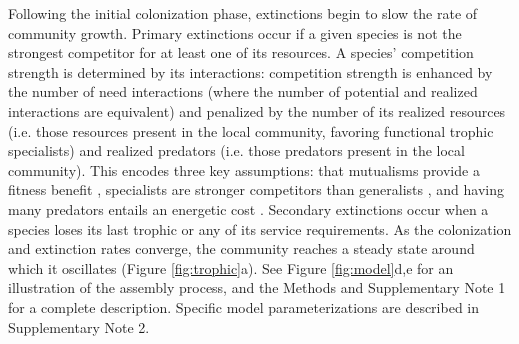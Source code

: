 \documentclass[twocolumn,preprintnumbers,amsmath,amssymb,superscriptaddress,linenumbers]{revtex4-1}
\begin{document}
Following the initial colonization phase, extinctions begin to slow the rate of community growth.
Primary extinctions occur if a given species is not the strongest competitor for at least one of its resources.
A species' competition strength is determined by its interactions: competition strength is enhanced by the number of need interactions (where the number of potential and realized interactions are equivalent) and penalized by the number of its realized resources (i.e. those resources present in the local community, favoring functional trophic specialists) and realized predators (i.e. those predators present in the local community).
This encodes three key assumptions: that mutualisms provide a fitness benefit \cite{Bronstein1994}, specialists are stronger competitors than generalists \cite{Macarthur1964,Dykhuizen1980,Futuyma1988,Costa2015}, and having many predators entails an energetic cost \cite{Brown1994}.
Secondary extinctions occur when a species loses its last trophic or any of its service requirements.
As the colonization and extinction rates converge, the community reaches a steady state around which it oscillates (Figure \ref{fig:trophic}a).
See Figure \ref{fig:model}d,e for an illustration of the assembly process, and the Methods and Supplementary Note 1 for a complete description.
Specific model parameterizations are described in Supplementary Note 2. %
\end{document}

